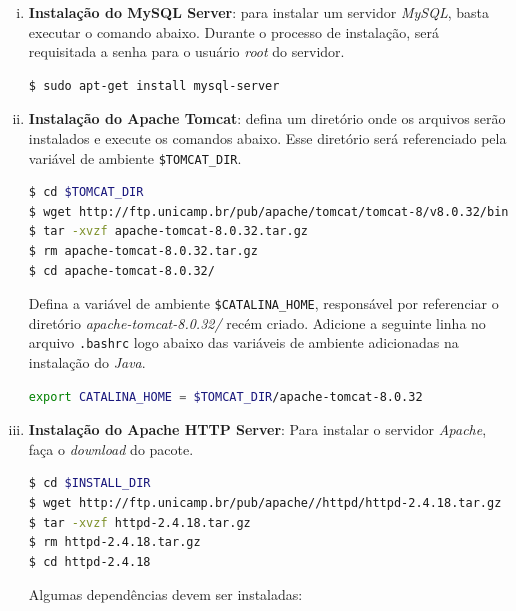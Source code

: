 \begin {enumerate}[i.]
\begin{lstlisting}[language=bash, style=nonumbers]
export JAVA_HOME="/usr/lib/jvm/java-8-openjdk-amd64"
export JRE_HOME="/usr/lib/jvm/java-8-openjdk-amd64/jre"
\end{lstlisting}

\item \textbf{Instalação do MySQL Server}: para instalar um servidor
\textit{MySQL}, basta executar o comando abaixo. Durante o processo de
instalação, será requisitada a senha para o usuário \textit{root} do servidor. 
\begin{lstlisting}[language=bash, style=nonumbers]
$ sudo apt-get install mysql-server
\end{lstlisting}

\item \textbf{Instalação do Apache Tomcat}: defina um diretório onde os arquivos
serão instalados e execute os comandos abaixo. Esse diretório será referenciado
pela variável de ambiente \texttt{\$TOMCAT\_DIR}.

\begin{lstlisting}[language=bash, style=nonumbers]
$ cd $TOMCAT_DIR
$ wget http://ftp.unicamp.br/pub/apache/tomcat/tomcat-8/v8.0.32/bin/apache-tomcat-8.0.32.tar.gz
$ tar -xvzf apache-tomcat-8.0.32.tar.gz
$ rm apache-tomcat-8.0.32.tar.gz
$ cd apache-tomcat-8.0.32/
\end{lstlisting}

Defina a variável de ambiente \texttt{\$CATALINA\_HOME}, responsável por
referenciar o diretório \textit{apache-tomcat-8.0.32/} recém criado. Adicione a
seguinte linha no arquivo \texttt{.bashrc} logo abaixo das variáveis de ambiente
adicionadas na instalação do \textit{Java}.

\begin{lstlisting}[language=bash, style=nonumbers]
export CATALINA_HOME = $TOMCAT_DIR/apache-tomcat-8.0.32
\end{lstlisting}

\item \textbf{Instalação do Apache HTTP Server}: Para instalar o servidor
\textit{Apache}, faça o \textit{download} do pacote. 

\begin{lstlisting}[language=bash, style=nonumbers]
$ cd $INSTALL_DIR
$ wget http://ftp.unicamp.br/pub/apache//httpd/httpd-2.4.18.tar.gz
$ tar -xvzf httpd-2.4.18.tar.gz
$ rm httpd-2.4.18.tar.gz
$ cd httpd-2.4.18
\end{lstlisting}

Algumas dependências devem ser instaladas:


\end{enumerate}
